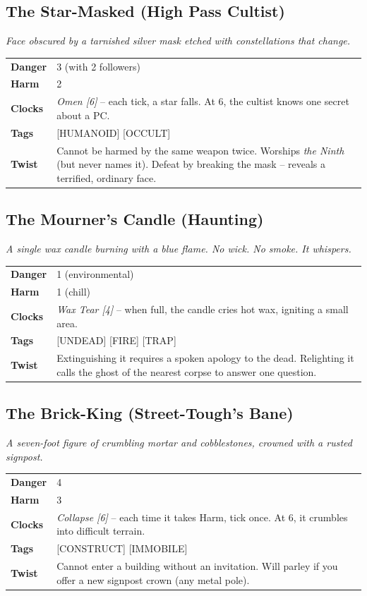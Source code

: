 \documentclass[10pt,twocolumn]{article}
\newcommand{\kw}[1]{\textbf{#1}}     %
\begin{document}
\subsection*{The Star-Masked (High Pass Cultist)}
\emph{Face obscured by a tarnished silver mask etched with constellations that change.}
\begin{tabular}{@{}ll}
\toprule
\kw{Danger} & 3 (with 2 followers) \\
\kw{Harm}   & 2 \\
\kw{Clocks} & \textit{Omen [6]} -- each tick, a star falls. At 6, the cultist knows one secret about a PC. \\
\kw{Tags}   & [HUMANOID] [OCCULT] \\
\kw{Twist}  & Cannot be harmed by the same weapon twice. Worships \emph{the Ninth} (but never names it). Defeat by breaking the mask -- reveals a terrified, ordinary face. \\
\bottomrule
\end{tabular}

\subsection*{The Mourner's Candle (Haunting)}
\emph{A single wax candle burning with a blue flame. No wick. No smoke. It whispers.}
\begin{tabular}{@{}ll}
\toprule
\kw{Danger} & 1 (environmental) \\
\kw{Harm}   & 1 (chill) \\
\kw{Clocks} & \textit{Wax Tear [4]} -- when full, the candle cries hot wax, igniting a small area. \\
\kw{Tags}   & [UNDEAD] [FIRE] [TRAP] \\
\kw{Twist}  & Extinguishing it requires a spoken apology to the dead. Relighting it calls the ghost of the nearest corpse to answer one question. \\
\bottomrule
\end{tabular}

\subsection*{The Brick-King (Street-Tough's Bane)}
\emph{A seven-foot figure of crumbling mortar and cobblestones, crowned with a rusted signpost.}
\begin{tabular}{@{}ll}
\toprule
\kw{Danger} & 4 \\
\kw{Harm}   & 3 \\
\kw{Clocks} & \textit{Collapse [6]} -- each time it takes Harm, tick once. At 6, it crumbles into difficult terrain. \\
\kw{Tags}   & [CONSTRUCT] [IMMOBILE] \\
\kw{Twist}  & Cannot enter a building without an invitation. Will parley if you offer a new signpost crown (any metal pole). \\
\bottomrule
\end{tabular}
\end{document}
